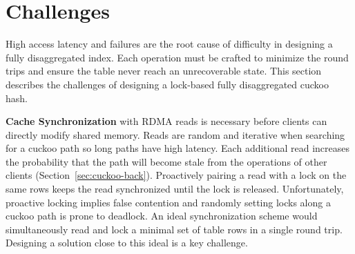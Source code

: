 \section{Challenges}
\label{sec:problems}

High access latency and failures are the root cause of
difficulty in designing a fully disaggregated index. Each
operation must be crafted to minimize the round trips and
ensure the table never reach an unrecoverable state. This
section describes the challenges of designing a lock-based
fully disaggregated cuckoo hash.

\textbf{Cache Synchronization} with RDMA reads is necessary
before clients can directly modify shared memory. Reads are
random and iterative when searching for a cuckoo path so
long paths have high latency. Each additional read increases
the probability that the path will become stale from the
operations of other clients (Section~\ref{sec:cuckoo-back}).
Proactively pairing a read with a lock on the same rows
keeps the read synchronized until the lock is released.
Unfortunately, proactive locking implies false contention
and randomly setting locks along a cuckoo path is prone to
deadlock.  An ideal synchronization scheme would
simultaneously read and lock a minimal set of table rows in
a single round trip.  Designing a solution close to this
ideal is a key challenge.





